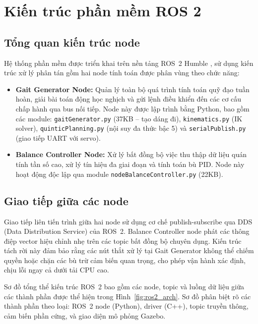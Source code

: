 \section{Kiến trúc phần mềm ROS 2}

\subsection{Tổng quan kiến trúc node}

Hệ thống phần mềm được triển khai trên nền tảng ROS~2 Humble \cite{ros2docs}, sử dụng kiến trúc xử lý phân tán gồm hai node tính toán được phân vùng theo chức năng:

\begin{itemize}
    \item \textbf{Gait Generator Node:} Quản lý toàn bộ quá trình tính toán quỹ đạo tuần hoàn, giải bài toán động học nghịch và gửi lệnh điều khiển đến các cơ cấu chấp hành qua bus nối tiếp. Node này được lập trình bằng Python, bao gồm các module: \texttt{gaitGenerator.py} (37KB -- tạo dáng đi), \texttt{kinematics.py} (IK solver), \texttt{quinticPlanning.py} (nội suy đa thức bậc 5) và \texttt{serialPublish.py} (giao tiếp UART với servo).
    
    \item \textbf{Balance Controller Node:} Xử lý bất đồng bộ việc thu thập dữ liệu quán tính tần số cao, xử lý tín hiệu đa giai đoạn và tính toán bù PID. Node này hoạt động độc lập qua module \texttt{nodeBalanceController.py} (22KB).
\end{itemize}

\subsection{Giao tiếp giữa các node}

Giao tiếp liên tiến trình giữa hai node sử dụng cơ chế publish-subscribe qua DDS (Data Distribution Service) của ROS~2. Balance Controller node phát các thông điệp vector hiệu chỉnh nhẹ trên các topic bất đồng bộ chuyên dụng. Kiến trúc tách rời này đảm bảo rằng các nút thắt xử lý tại Gait Generator không thể chiếm quyền hoặc chặn các bù trừ cảm biến quan trọng, cho phép vận hành xác định, chịu lỗi ngay cả dưới tải CPU cao.

Sơ đồ tổng thể kiến trúc ROS~2 bao gồm các node, topic và luồng dữ liệu giữa các thành phần được thể hiện trong Hình~\ref{fig:ros2_arch}. Sơ đồ phân biệt rõ các thành phần theo loại: ROS~2 node (Python), driver (C++), topic truyền thông, cảm biến phần cứng, và giao diện mô phỏng Gazebo.

